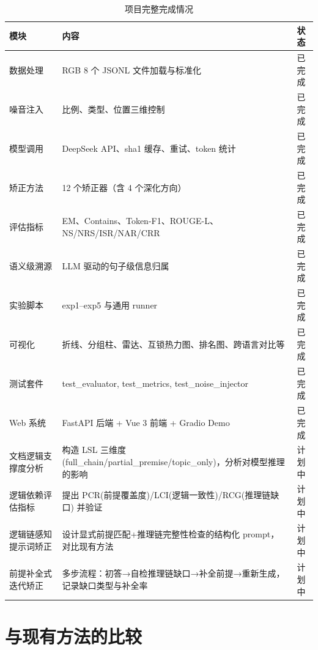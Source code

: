 \documentclass[UTF8,zihao=-4]{ctexart}
\newcommand{\statusdone}{\textcolor{green!50!black}{已完成}}
\newcommand{\statusplan}{\textcolor{orange!70!black}{计划中}}
\begin{document}
\begin{table}[H]
  \centering
  \caption{项目完整完成情况}
  \begin{tabularx}{\textwidth}{lYc}
    \toprule
    模块 & 内容 & 状态 \\
    \midrule
    数据处理 & RGB 8 个 JSONL 文件加载与标准化 & \statusdone \\
    噪音注入 & 比例、类型、位置三维控制 & \statusdone \\
    模型调用 & DeepSeek API、sha1 缓存、重试、token 统计 & \statusdone \\
    矫正方法 & 12 个矫正器（含 4 个深化方向） & \statusdone \\
    评估指标 & EM、Contains、Token-F1、ROUGE-L、NS/NRS/ISR/NAR/CRR & \statusdone \\
    语义级溯源 & LLM 驱动的句子级信息归属 & \statusdone \\
    实验脚本 & exp1--exp5 与通用 runner & \statusdone \\
    可视化 & 折线、分组柱、雷达、互锁热力图、排名图、跨语言对比等 & \statusdone \\
    测试套件 & test\_evaluator, test\_metrics, test\_noise\_injector & \statusdone \\
    Web 系统 & FastAPI 后端 + Vue 3 前端 + Gradio Demo & \statusdone \\
    \midrule
    文档逻辑支撑度分析 & 构造 LSL 三维度(full\_chain/partial\_premise/topic\_only)，分析对模型推理的影响 & \statusplan \\
    逻辑依赖评估指标 & 提出 PCR(前提覆盖度)/LCI(逻辑一致性)/RCG(推理链缺口) 并验证 & \statusplan \\
    逻辑链感知提示词矫正 & 设计显式前提匹配+推理链完整性检查的结构化 prompt，对比现有方法 & \statusplan \\
    前提补全式迭代矫正 & 多步流程：初答→自检推理链缺口→补全前提→重新生成，记录缺口类型与补全率 & \statusplan \\
    \bottomrule
  \end{tabularx}
\end{table}



\section{与现有方法的比较}
\end{document}
